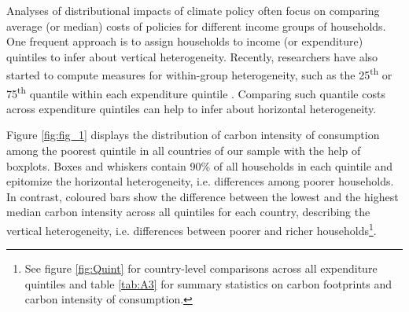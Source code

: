 \documentclass[12pt, a4paper]{article}
\begin{document}

Analyses of distributional impacts of climate policy often focus on comparing average (or median) costs of policies for different income groups of households. One frequent approach is to assign households to income (or expenditure) quintiles to infer about vertical heterogeneity. Recently, researchers have also started to compute measures for within-group heterogeneity, such as the 25\textsuperscript{th} or 75\textsuperscript{th} quantile within each expenditure quintile \autocite{Cronin.2019, Missbach.2024}. Comparing such quantile costs across expenditure quintiles can help to infer about horizontal heterogeneity.

Figure \ref{fig:fig_1} displays the distribution of carbon intensity of consumption among the poorest quintile in all countries of our sample with the help of boxplots. Boxes and whiskers contain 90\% of all households in each quintile and epitomize the horizontal heterogeneity, i.e. differences among poorer households. In contrast, coloured bars show the difference between the lowest and the highest median carbon intensity across all quintiles for each country, describing the vertical heterogeneity, i.e. differences between poorer and richer households\footnote{See figure \ref{fig:Quint} for country-level comparisons across all expenditure quintiles and table \ref{tab:A3} for summary statistics on carbon footprints and carbon intensity of consumption.}.
\end{document}
